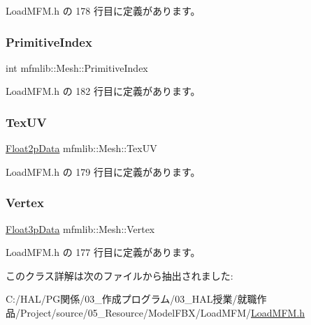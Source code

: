  Load\+M\+F\+M.\+h の 178 行目に定義があります。

\mbox{\label{classmfmlib_1_1_mesh_aae7ea245b25b22be622c58b21c4a2a06}} 
\subsubsection{\texorpdfstring{Primitive\+Index}{PrimitiveIndex}}
{\footnotesize\ttfamily int mfmlib\+::\+Mesh\+::\+Primitive\+Index}



 Load\+M\+F\+M.\+h の 182 行目に定義があります。

\mbox{\label{classmfmlib_1_1_mesh_a8cf113dcdb5f339dbe192072205d9210}} 
\subsubsection{\texorpdfstring{Tex\+UV}{TexUV}}
{\footnotesize\ttfamily \mbox{\hyperlink{classmfmlib_1_1_float2p_data}{Float2p\+Data}} mfmlib\+::\+Mesh\+::\+Tex\+UV}



 Load\+M\+F\+M.\+h の 179 行目に定義があります。

\mbox{\label{classmfmlib_1_1_mesh_aa51a50ca2d51c283769d0efff0122d81}} 
\subsubsection{\texorpdfstring{Vertex}{Vertex}}
{\footnotesize\ttfamily \mbox{\hyperlink{classmfmlib_1_1_float3p_data}{Float3p\+Data}} mfmlib\+::\+Mesh\+::\+Vertex}



 Load\+M\+F\+M.\+h の 177 行目に定義があります。



このクラス詳解は次のファイルから抽出されました\+:\begin{DoxyCompactItemize}
\item 
C\+:/\+H\+A\+L/\+P\+G関係/03\+\_\+作成プログラム/03\+\_\+\+H\+A\+L授業/就職作品/\+Project/source/05\+\_\+\+Resource/\+Model\+F\+B\+X/\+Load\+M\+F\+M/\mbox{\hyperlink{_load_m_f_m_8h}{Load\+M\+F\+M.\+h}}\end{DoxyCompactItemize}
